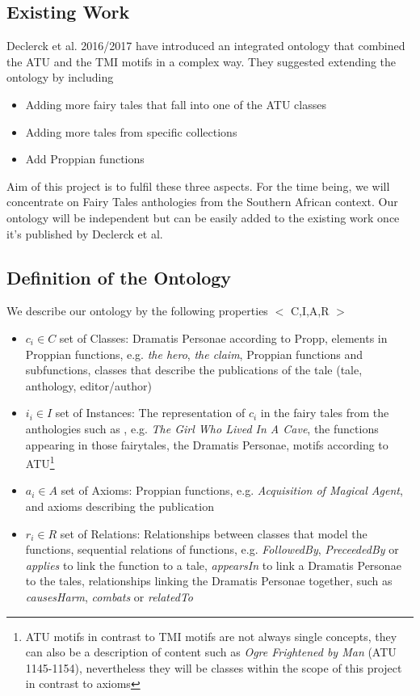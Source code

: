 \documentclass[10pt,a4paper]{article}
\begin{document}
	\subsection{Existing Work} 
	Declerck et al. 2016/2017 \cite{Declerck2017} have introduced an integrated ontology that combined the ATU and the TMI motifs in a complex way. They suggested extending the ontology by including 
	
	\begin{itemize}
		\item Adding more fairy tales that fall into one of the ATU classes
		\item Adding more tales from specific collections
		\item Add Proppian functions
		
	\end{itemize}	  
	
	Aim of this project is to fulfil these three aspects. For the time being, we will concentrate on Fairy Tales anthologies from the Southern African context. Our ontology will be independent but can be easily added to the existing work once it's published by Declerck et al.\cite{Declerck2017} 
	\subsection{Definition of the Ontology}
	We describe our ontology by the following properties $<$ C,I,A,R $>$

\begin{itemize}
	
	\item $c_{i} \in C $ set of Classes: Dramatis Personae according to Propp, elements in Proppian functions, e.g. \textit{the hero}, \textit{the claim}, Proppian functions and subfunctions, classes that describe the publications of the tale (tale, anthology, editor/author)       
	\item $i_{i} \in I $ set of Instances: The representation of $c_{i}$ in the fairy tales from the anthologies such as \cite{Smith1989}, e.g. \textit{The Girl Who Lived In A Cave}, the functions appearing in those fairytales, the Dramatis Personae,  motifs according to ATU\footnote{ATU motifs in contrast to TMI motifs are not always single concepts, they can also be a description of content such as \textit{Ogre Frightened by Man} (ATU 1145-1154), nevertheless they will be classes within the scope of this project in contrast to axioms} 
	\item $a_{i} \in A$  set of Axioms: Proppian functions, e.g. \textit{Acquisition of Magical Agent}, and axioms describing the publication 
	\item $r_{i} \in R $ set of Relations: Relationships between classes that model the functions, sequential relations of functions, e.g. \textit{FollowedBy}, \textit{PreceededBy} or \textit{applies} to link the function to a tale, \textit{appearsIn} to link a Dramatis Personae to the tales, relationships linking the Dramatis Personae together, such as \textit{causesHarm}, \textit{combats} or \textit{relatedTo}
	 
\end{itemize}
\end{document}
